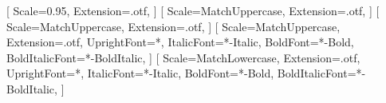     \newfontface{}[%
    	Scale=0.95,%
    	Extension=.otf,
    	]
    \newfontface{}[%
    	Scale=MatchUppercase,
    	Extension=.otf,
    	]
    \newfontface{}[%
    	Scale=MatchUppercase,
    	Extension=.otf,
     	]
    \newfontface{}[%
    	Scale=MatchUppercase,
    	Extension=.otf,
        UprightFont=*,
        ItalicFont=*-Italic,
        BoldFont=*-Bold,
        BoldItalicFont=*-BoldItalic,
    	]
    \newfontface{}[%
    	Scale=MatchLowercase,%
    	Extension=.otf,
        UprightFont=*,
        ItalicFont=*-Italic,
        BoldFont=*-Bold,
        BoldItalicFont=*-BoldItalic,
    	]
\fi
%
\RequirePackage{etoolbox} %
